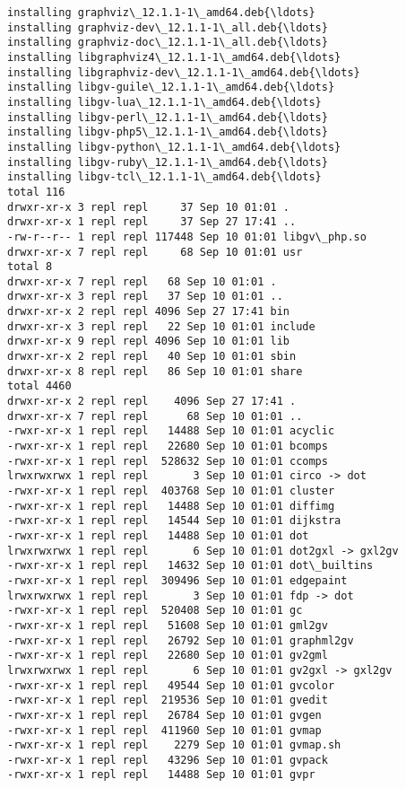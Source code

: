 \documentclass[11pt]{article}
\begin{document}
    \begin{Verbatim}[commandchars=\\\{\}]
installing graphviz\_12.1.1-1\_amd64.deb{\ldots}
installing graphviz-dev\_12.1.1-1\_all.deb{\ldots}
installing graphviz-doc\_12.1.1-1\_all.deb{\ldots}
installing libgraphviz4\_12.1.1-1\_amd64.deb{\ldots}
installing libgraphviz-dev\_12.1.1-1\_amd64.deb{\ldots}
installing libgv-guile\_12.1.1-1\_amd64.deb{\ldots}
installing libgv-lua\_12.1.1-1\_amd64.deb{\ldots}
installing libgv-perl\_12.1.1-1\_amd64.deb{\ldots}
installing libgv-php5\_12.1.1-1\_amd64.deb{\ldots}
installing libgv-python\_12.1.1-1\_amd64.deb{\ldots}
installing libgv-ruby\_12.1.1-1\_amd64.deb{\ldots}
installing libgv-tcl\_12.1.1-1\_amd64.deb{\ldots}
total 116
drwxr-xr-x 3 repl repl     37 Sep 10 01:01 .
drwxr-xr-x 1 repl repl     37 Sep 27 17:41 ..
-rw-r--r-- 1 repl repl 117448 Sep 10 01:01 libgv\_php.so
drwxr-xr-x 7 repl repl     68 Sep 10 01:01 usr
total 8
drwxr-xr-x 7 repl repl   68 Sep 10 01:01 .
drwxr-xr-x 3 repl repl   37 Sep 10 01:01 ..
drwxr-xr-x 2 repl repl 4096 Sep 27 17:41 bin
drwxr-xr-x 3 repl repl   22 Sep 10 01:01 include
drwxr-xr-x 9 repl repl 4096 Sep 10 01:01 lib
drwxr-xr-x 2 repl repl   40 Sep 10 01:01 sbin
drwxr-xr-x 8 repl repl   86 Sep 10 01:01 share
total 4460
drwxr-xr-x 2 repl repl    4096 Sep 27 17:41 .
drwxr-xr-x 7 repl repl      68 Sep 10 01:01 ..
-rwxr-xr-x 1 repl repl   14488 Sep 10 01:01 acyclic
-rwxr-xr-x 1 repl repl   22680 Sep 10 01:01 bcomps
-rwxr-xr-x 1 repl repl  528632 Sep 10 01:01 ccomps
lrwxrwxrwx 1 repl repl       3 Sep 10 01:01 circo -> dot
-rwxr-xr-x 1 repl repl  403768 Sep 10 01:01 cluster
-rwxr-xr-x 1 repl repl   14488 Sep 10 01:01 diffimg
-rwxr-xr-x 1 repl repl   14544 Sep 10 01:01 dijkstra
-rwxr-xr-x 1 repl repl   14488 Sep 10 01:01 dot
lrwxrwxrwx 1 repl repl       6 Sep 10 01:01 dot2gxl -> gxl2gv
-rwxr-xr-x 1 repl repl   14632 Sep 10 01:01 dot\_builtins
-rwxr-xr-x 1 repl repl  309496 Sep 10 01:01 edgepaint
lrwxrwxrwx 1 repl repl       3 Sep 10 01:01 fdp -> dot
-rwxr-xr-x 1 repl repl  520408 Sep 10 01:01 gc
-rwxr-xr-x 1 repl repl   51608 Sep 10 01:01 gml2gv
-rwxr-xr-x 1 repl repl   26792 Sep 10 01:01 graphml2gv
-rwxr-xr-x 1 repl repl   22680 Sep 10 01:01 gv2gml
lrwxrwxrwx 1 repl repl       6 Sep 10 01:01 gv2gxl -> gxl2gv
-rwxr-xr-x 1 repl repl   49544 Sep 10 01:01 gvcolor
-rwxr-xr-x 1 repl repl  219536 Sep 10 01:01 gvedit
-rwxr-xr-x 1 repl repl   26784 Sep 10 01:01 gvgen
-rwxr-xr-x 1 repl repl  411960 Sep 10 01:01 gvmap
-rwxr-xr-x 1 repl repl    2279 Sep 10 01:01 gvmap.sh
-rwxr-xr-x 1 repl repl   43296 Sep 10 01:01 gvpack
-rwxr-xr-x 1 repl repl   14488 Sep 10 01:01 gvpr

\end{Verbatim}
\end{document}

